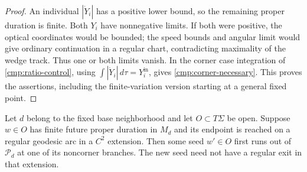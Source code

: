 \begin{proof}
An individual $|\dot Y_i|$ has a positive lower bound, so the remaining
proper duration is finite. Both $Y_i$ have nonnegative limits. If both
were positive, the optical coordinates would be bounded; the speed
bounds and angular limit would give ordinary continuation in a regular
chart, contradicting maximality of the wedge track. Thus one or both
limits vanish. In the corner case integration of
\eqref{cmp:ratio-control}, using
$\int |\dot Y_i|\,d\tau=Y_i^{\mathrm{in}}$, gives
\eqref{cmp:corner-necessary}. This proves the assertions, including
the finite-variation version starting at a general fixed point.
\end{proof}

\begin{proposition}
\label{cmp:branch-seed}
Let $d$ belong to the fixed base neighborhood and let
$O\subset T\Sigma$ be open. Suppose $w\in O$ has finite future
proper duration in $M_d$ and its endpoint is reached on a regular
geodesic arc in a $C^2$ extension. Then some seed $w'\in O$ first
runs out of $\mathcal P_d$ at one of its noncorner branches.
The new seed need not have a regular exit in that extension.
\end{proposition}

